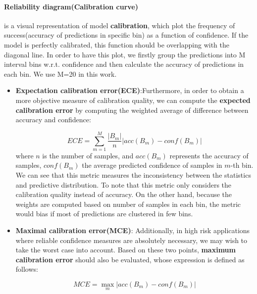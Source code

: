 \paragraph{Reliability diagram(Calibration curve)} is a visual representation of model \textbf{calibration}\cite{guo2017calibration}, which plot the frequency of success(accuracy of predictions in specific bin) as a function of confidence. If the model is perfectly calibrated, this function should be overlapping with the diagonal line. 
In order to have this plot, we firstly group the predictions into M interval bins w.r.t. confidence and then calculate the accuracy of predictions in each bin. We use M=20 in this work.
\begin{itemize}
	\item \textbf{Expectation calibration error(ECE)}:Furthermore, in order to obtain a more objective measure of calibration quality, we can compute the \textbf{expected calibration error} by computing the weighted average of difference between accuracy and confidence:
	
	\begin{equation}
	ECE = \sum_{m=1}^{M}\frac{|B_m|}{n}|acc(B_m) - conf(B_m)|
	\end{equation}
	where $n$ is the number of samples, and $acc(B_m)$ represents the accuracy of samples, $conf(B_m)$ the average predicted confidence of samples in $m$-th bin. We can see that this metric measures the inconsistency between the statistics and predictive distribution. To note that this metric only considers the calibration quality instead of accuracy. On the other hand, because the weights are computed based on number of samples in each bin, the metric would bias if most of predictions are clustered in few bins. 
	
	\item \textbf{Maximal calibration error(MCE)}:
	Additionally, in high risk applications where reliable confidence measures are absolutely necessary, we may wish to take the worst case into account. Based on these two points, \textbf{maximum calibration error} should also be evaluated, whose expression is defined as follows:
	
	\begin{equation}
	MCE = \max_m|acc(B_m) - conf(B_m)|
	\end{equation}
\end{itemize}


